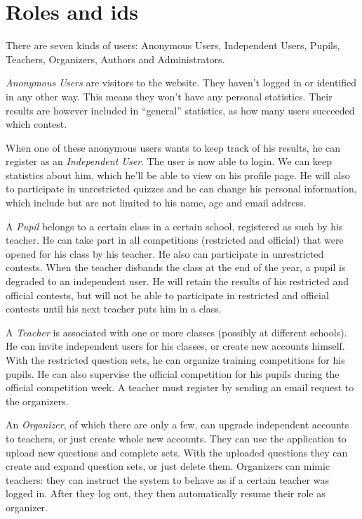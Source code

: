 \section{Roles and ids}

There are seven kinds of users: Anonymous Users, Independent Users, Pupils,
Teachers, Organizers, Authors and Administrators.

\textit{Anonymous Users} are visitors to the website. They haven't logged in or
identified in any other way. This means they won't have any personal
statistics. Their results are however included in ``general'' statistics, as
how many users succeeded which contest.

When one of these anonymous users wants to keep track of his results, he can
register as an \textit{Independent User}. The user is now able to login. We can
keep statistics about him, which he'll be able to view on his profile page.  
He will also to participate in unrestricted quizzes and he
can change his personal information, which include but are not limited to his
name, age and email address.

A \textit{Pupil} belongs to a certain class in a certain school, registered
as such by his teacher. He can take part in all competitions (restricted and
official) that were opened for his class by his teacher. He also can
participate in unrestricted contests. When the teacher disbands the class at
the end of the year, a pupil is degraded to an independent user. He will
retain the results of his restricted and official contests, but will not be
able to participate in restricted and official contests until his next teacher puts him in a class.

A \textit{Teacher} is associated with one or more classes (possibly at
different schools). He can invite independent users for his classes, or create
new accounts himself. With the restricted question sets, he can organize
training competitions for his pupils. He can also supervise the official
competition for his pupils during the official competition week. A teacher
must register by sending an email request to the organizers.

An \textit{Organizer}, of which there are only a few, can upgrade independent
accounts to teachers, or just create whole new accounts. They can use the
application to upload new questions and complete sets. With the uploaded
questions they can create and expand question sets, or just delete them.
Organizers can mimic teachers: they can instruct the system to behave as if a
certain teacher was logged in. After they log out, they then automatically
resume their role as organizer.

